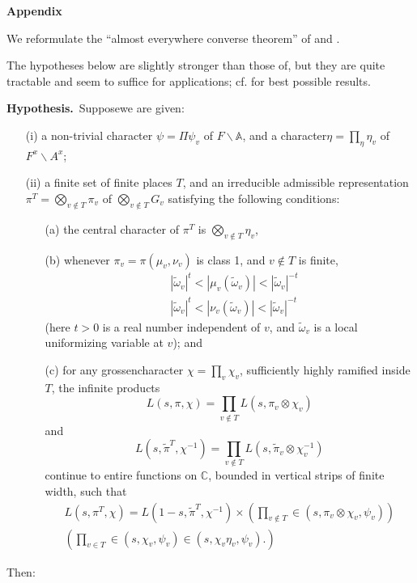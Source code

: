 \medskip
\noindent
{\bf Appendix}
\smallskip

We reformulate the ``almost everywhere converse theorem'' of\break \cite{Jacquet-Langlands} and \cite{Weil 2}.

The hypotheses below are slightly stronger than those of\break \cite{Jacquet-Langlands}, but they are quite tractable and seem to suffice for applications; cf. \cite{PS 2} for best possible results.

\medskip
\noindent
{\bf Hypothesis.}~Suppose\pageoriginale we are given:
\begin{itemize}
\item[(i)] a non-trivial character $\psi=\Pi\psi_{v}$ of $F\backslash \mathbb{A}$, and a character\break $\eta=\prod\limits_{\eta}\eta_{v}$ of $F^{x}\backslash A^{x}$;

\item[(ii)] a finite set of finite places $T$, and an irreducible admissible representation $\pi^{T}=\bigotimes\limits_{v\not\in T}\pi_{v}$ of $\bigotimes\limits_{v\not\in T}G_{v}$ satisfying the following conditions:
\begin{itemize}
\item[(a)] the central character of $\pi^{T}$ is $\bigotimes\limits_{v\not\in T}\eta_{v}$,

\item[(b)] whenever $\pi_{v}=\pi(\mu_{v},\nu_{v})$ is class 1, and $v\not\in T$ is finite,
\begin{align*}
& |\widetilde{\omega}_{v}|^{t}<|\mu_{v}(\widetilde{\omega}_{v})|<|\widetilde{\omega}_{v}|^{-t}\\[4pt]
& |\widetilde{\omega}_{v}|^{t}<|\nu_{v}(\widetilde{\omega}_{v})|<|\widetilde{\omega}_{v}|^{-t}
\end{align*}
(here $t>0$ is a real number independent of $v$, and $\widetilde{\omega}_{v}$ is a local uniformizing variable at $v$); and

\item[(c)] for any grossencharacter $\chi=\prod\limits_{v}\chi_{v}$, sufficiently highly ramified inside $T$, the infinite products
$$
L(s,\pi,\chi)=\prod\limits_{v\not\in T}L(s,\pi_{v}\otimes \chi_{v})
$$
and
$$
L(s,\widetilde{\pi}^{T},\chi^{-1})=\prod\limits_{v\not\in T}L(s,\widetilde{\pi}_{v}\otimes \chi^{-1}_{v})
$$
continue to entire functions on $\mathbb{C}$, bounded in vertical strips of finite width, such that
\begin{gather*}
L(s,\pi^{T},\chi)=L(1-s,\widetilde{\pi}^{T},\chi^{-1})\times\left(\prod\limits_{v\not\in T}\in (s,\pi_{v}\otimes \chi_{v},\psi_{v})\right)\\
\left(\prod\limits_{v\in T}\in (s,\chi_{v},\psi_{v})\in (s,\chi_{v}\eta_{v},\psi_{v}).\right)
\end{gather*}
\end{itemize}
\end{itemize}
Then:

